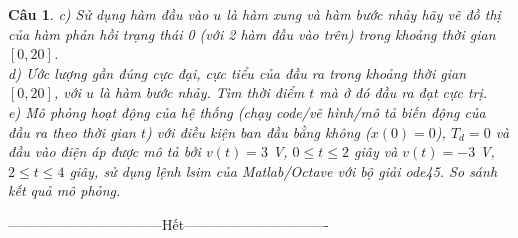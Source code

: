 \documentclass[11pt]{article}
\newtheorem{bt}{Câu}
\begin{document}
\begin{bt}
c) Sử dụng hàm đầu vào $u$ là hàm xung và hàm bước nhảy hãy vẽ đồ thị của hàm phản hồi trạng thái 0 (với 2 hàm đầu vào trên) trong khoảng thời gian $[0,20]$. \\

d) Ước lượng gần đúng cực đại, cực tiểu của đầu ra trong khoảng thời gian $[0,20]$, với $u$ là hàm bước nhảy. Tìm thời điểm $t$ mà ở đó đầu ra đạt cực trị. \\

e) Mô phỏng hoạt động của hệ thống (chạy code/vẽ hình/mô tả biến động của đầu ra theo thời gian $t$) với điều kiện ban đầu bằng không ($x(0)=0$), $T_d = 0$ và 
đầu vào điện áp được mô tả bởi $v(t) = 3$ V, $0 \leq t \leq 2 $ giây và $v(t) = -3$ V, $2 \leq t \leq 4$ giây, sử dụng lệnh lsim của Matlab/Octave 
với bộ giải ode45. So sánh kết quả mô phỏng.
\end{bt}


\centerline{———————————Hết——————————-}
\end{document}
